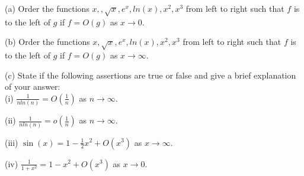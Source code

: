 \documentclass[12pt]{article}
\begin{document}
\studentinfo
{}
\finishfirstpage

\newpage


\noindent 
(a) Order the functions $x, , \sqrt{x}, e^x, ln(x), x^2, x^3$ from left to right such that $f$ is to the left of $g$ if $f=O(g)$ as $x \to 0$. \\

\vspace{1 in}

\noindent
(b) Order the functions $x, \sqrt{x}, e^x, ln(x), x^2, x^3$ from left to right such that $f$ is to the left of $g$ if $f=O(g)$ as $x \to \infty$. \\

\vspace{1 in}

\noindent
(c) State if the following assertions are true or false and give a brief explanation of your answer: \\
(i) $\frac{1}{n ln(n)} = O(\frac{1}{n})$ as $n \to \infty$. \\

\vspace{1in}

\noindent
(ii) $\frac{1}{n ln(n)}=o(\frac{1}{n})$ as $n \to \infty$. \\

\vspace{1in}

\noindent
(iii) $\sin(x) = 1 - \frac{1}{2}x^2 + O(x^3)$ as $x \to \infty$. \\

\vspace{1in}

\noindent
(iv) $\frac{1}{1+x^2} = 1- x^2+  O(x^3)$ as $x \to 0$. \\
\end{document}
